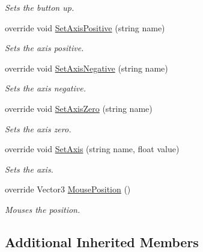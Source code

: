 \begin{DoxyCompactItemize}
\begin{DoxyCompactList}\small\item\em Sets the button up. \end{DoxyCompactList}\item 
override void \hyperlink{class_lerp2_assets_1_1_cross_platform_input_1_1_platform_specific_1_1_standalone_input_a4712f03e0dab60dca4eb97b6d1b82f1b}{Set\+Axis\+Positive} (string name)
\begin{DoxyCompactList}\small\item\em Sets the axis positive. \end{DoxyCompactList}\item 
override void \hyperlink{class_lerp2_assets_1_1_cross_platform_input_1_1_platform_specific_1_1_standalone_input_a41a2db3d47fbc9c320551d32e0f9c187}{Set\+Axis\+Negative} (string name)
\begin{DoxyCompactList}\small\item\em Sets the axis negative. \end{DoxyCompactList}\item 
override void \hyperlink{class_lerp2_assets_1_1_cross_platform_input_1_1_platform_specific_1_1_standalone_input_afb7577a7f8192004d1c29860de5eb503}{Set\+Axis\+Zero} (string name)
\begin{DoxyCompactList}\small\item\em Sets the axis zero. \end{DoxyCompactList}\item 
override void \hyperlink{class_lerp2_assets_1_1_cross_platform_input_1_1_platform_specific_1_1_standalone_input_a350dafd6b0bb5d5b1b1d63c09664c498}{Set\+Axis} (string name, float value)
\begin{DoxyCompactList}\small\item\em Sets the axis. \end{DoxyCompactList}\item 
override Vector3 \hyperlink{class_lerp2_assets_1_1_cross_platform_input_1_1_platform_specific_1_1_standalone_input_a1ff080282b92ef258018a7df697f262a}{Mouse\+Position} ()
\begin{DoxyCompactList}\small\item\em Mouses the position. \end{DoxyCompactList}\end{DoxyCompactItemize}
\subsection*{Additional Inherited Members}


